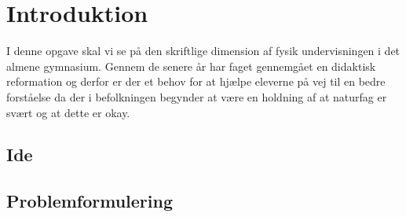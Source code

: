 \chapter{Introduktion}
\label{Ch:1}

I denne opgave skal vi se på den skriftlige dimension af fysik undervisningen i det almene gymnasium. Gennem de senere år har faget gennemgået en didaktisk reformation og derfor er der et behov for at hjælpe eleverne på vej til en bedre forståelse da der i befolkningen begynder at være en holdning af at naturfag er svært og at dette er okay.

\section{Ide}
\label{sec:1.1}
\lipsum*


\section{Problemformulering}
\label{sec:1.2}

\lipsum*